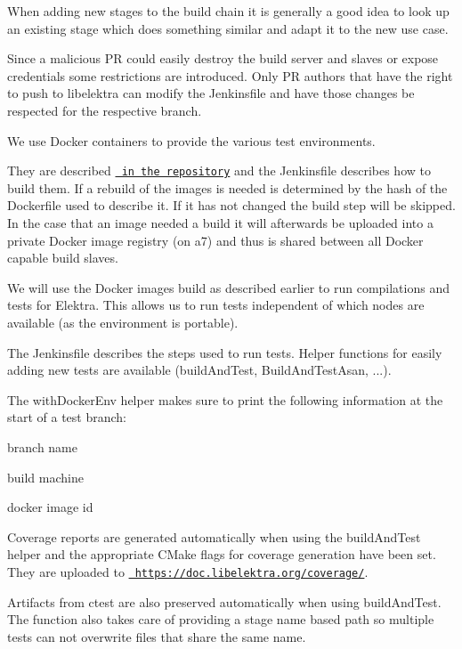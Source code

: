 When adding new stages to the build chain it is generally a good idea to look up an existing stage which does something similar and adapt it to the new use case.

Since a malicious PR could easily destroy the build server and slaves or expose credentials some restrictions are introduced. Only PR authors that have the right to push to libelektra can modify the Jenkinsfile and have those changes be respected for the respective branch.

We use Docker containers to provide the various test environments.

They are described \href{https://master.libelektra.org/scripts/docker}{\texttt{ in the repository}} and the Jenkinsfile describes how to build them. If a rebuild of the images is needed is determined by the hash of the Dockerfile used to describe it. If it has not changed the build step will be skipped. In the case that an image needed a build it will afterwards be uploaded into a private Docker image registry (on a7) and thus is shared between all Docker capable build slaves.

We will use the Docker images build as described earlier to run compilations and tests for Elektra. This allows us to run tests independent of which nodes are available (as the environment is portable).

The Jenkinsfile describes the steps used to run tests. Helper functions for easily adding new tests are available ({\ttfamily build\+And\+Test}, {\ttfamily Build\+And\+Test\+Asan}, ...).

The {\ttfamily with\+Docker\+Env} helper makes sure to print the following information at the start of a test branch\+:


\begin{DoxyItemize}
\item branch name
\item build machine
\item docker image id
\end{DoxyItemize}

Coverage reports are generated automatically when using the {\ttfamily build\+And\+Test} helper and the appropriate C\+Make flags for coverage generation have been set. They are uploaded to \href{https://doc.libelektra.org/coverage/}{\texttt{ https\+://doc.\+libelektra.\+org/coverage/}}.

Artifacts from {\ttfamily ctest} are also preserved automatically when using {\ttfamily build\+And\+Test}. The function also takes care of providing a stage name based path so multiple tests can not overwrite files that share the same name.

